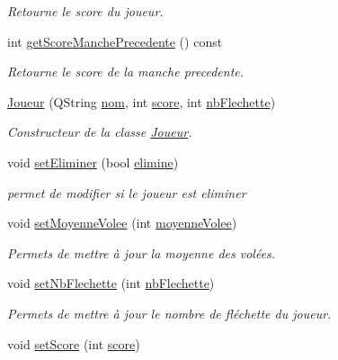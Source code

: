 \begin{DoxyCompactItemize}
\begin{DoxyCompactList}\small\item\em Retourne le score du joueur. \end{DoxyCompactList}\item 
int \hyperlink{class_joueur_ade4640f21e0f3c30390bda7d25b748fa}{get\+Score\+Manche\+Precedente} () const
\begin{DoxyCompactList}\small\item\em Retourne le score de la manche precedente. \end{DoxyCompactList}\item 
\hyperlink{class_joueur_a3832d331fb872c978f7a2d890b024b4c}{Joueur} (Q\+String \hyperlink{class_joueur_ab06d7f1e6b482299bb03919e0cd2166d}{nom}, int \hyperlink{class_joueur_a680896b9ff71c2762ae653ef6aa7c8ce}{score}, int \hyperlink{class_joueur_a330099a1952fbf97b2faea2c640b32f5}{nb\+Flechette})
\begin{DoxyCompactList}\small\item\em Constructeur de la classe \hyperlink{class_joueur}{Joueur}. \end{DoxyCompactList}\item 
void \hyperlink{class_joueur_a41dd9db4a09cd689183cc104dd1e268b}{set\+Eliminer} (bool \hyperlink{class_joueur_acac733012102f81d05b0a4c0801fcf61}{elimine})
\begin{DoxyCompactList}\small\item\em permet de modifier si le joueur est eliminer \end{DoxyCompactList}\item 
void \hyperlink{class_joueur_ab3cbde2b9f1662d47cbf4d892b11c933}{set\+Moyenne\+Volee} (int \hyperlink{class_joueur_ac5641a2a8fc1deebe5bba27bf21eb446}{moyenne\+Volee})
\begin{DoxyCompactList}\small\item\em Permets de mettre à jour la moyenne des volées. \end{DoxyCompactList}\item 
void \hyperlink{class_joueur_a3220b85c9480a2178764ef58029108aa}{set\+Nb\+Flechette} (int \hyperlink{class_joueur_a330099a1952fbf97b2faea2c640b32f5}{nb\+Flechette})
\begin{DoxyCompactList}\small\item\em Permets de mettre à jour le nombre de fléchette du joueur. \end{DoxyCompactList}\item 
void \hyperlink{class_joueur_aa7d833f3aa6058cd51a30c7e6270e696}{set\+Score} (int \hyperlink{class_joueur_a680896b9ff71c2762ae653ef6aa7c8ce}{score})

\end{DoxyCompactItemize}
